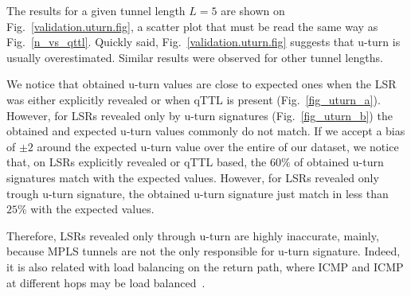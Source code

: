 The results for a given tunnel length $L=5$ are shown on
Fig.~\ref{validation.uturn.fig}, a scatter plot that must be read the same way
as Fig.~\ref{n_vs_qttl}.  Quickly said, Fig.~\ref{validation.uturn.fig} suggests
that u-turn is usually overestimated. Similar results were observed for other
tunnel lengths. 

We notice that obtained u-turn values are close to expected ones when the LSR
was either explicitly revealed or when qTTL is present (Fig.~\ref{fig_uturn_a}).
However, for LSRs revealed only by u-turn signatures (Fig.~\ref{fig_uturn_b})
the obtained and expected u-turn values commonly do not match. If we accept a
bias of $ \pm 2$ around the expected u-turn value over the entire of our
dataset, we notice that, on LSRs explicitly revealed or qTTL based, the $60\%$
of obtained u-turn signatures match with the expected values. However, for LSRs
revealed only trough u-turn signature, the obtained u-turn signature just match
in less than $25\%$  with the expected values.

Therefore, LSRs revealed only through u-turn are highly inaccurate, mainly,
because MPLS tunnels are not the only responsible for u-turn signature. Indeed, it is
also related with load balancing on the return path, where ICMP \echoreply and
ICMP \ttlexceeded at different hops may be load balanced~\cite{BRICE06}. 


